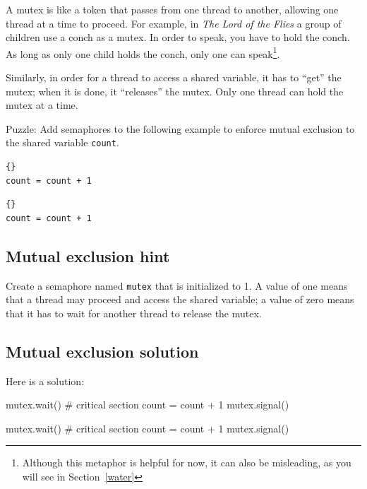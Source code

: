 \documentclass{book}
\begin{document}
A mutex is like a token that passes from one thread to another,
allowing one thread at a time to proceed.  For example, in {\em The
        Lord of the Flies} a group of children use a conch as a mutex.  In
order to speak, you have to hold the conch.  As long as only one child
holds the conch, only one can speak\footnote{Although this metaphor
    is helpful for now, it can also be misleading, as you will see in
    Section~\ref{water}}.

Similarly, in order for a thread to access a shared variable,
it has to ``get'' the mutex; when it is done, it ``releases''
the mutex.  Only one thread can hold the mutex at a time.

Puzzle: Add semaphores to the following example to
enforce mutual exclusion to the shared variable {\tt count}.

\noindent\begin{minipage}[t]{0.4\textwidth}
    \begin{lstlisting}[title={Thread A}]{}
count = count + 1
\end{lstlisting}
\end{minipage}
\hfill
\noindent\begin{minipage}[t]{0.4\textwidth}
    \begin{lstlisting}[title={Thread B}]{}
count = count + 1
\end{lstlisting}
\end{minipage}




\subsection{Mutual exclusion hint}

Create a semaphore named {\tt mutex} that is initialized
to 1.  A value of one means that a thread may proceed and
access the shared variable; a value of zero means that it
has to wait for another thread to release the mutex.



\subsection{Mutual exclusion solution}

Here is a solution:

\noindent\begin{minipage}[t]{0.42\textwidth}
    \begin{unbreakable}[basicstyle=\scriptsize,title={Thread A}]{}
mutex.wait()
 # critical section
 count = count + 1
mutex.signal()
\end{unbreakable}
\end{minipage}
\hfill
\noindent\begin{minipage}[t]{0.42\textwidth}
    \begin{unbreakable}[basicstyle=\scriptsize,title={Thread B}]{}
mutex.wait()
 # critical section
 count = count + 1
mutex.signal()
\end{unbreakable}
\end{minipage}
\end{document}
